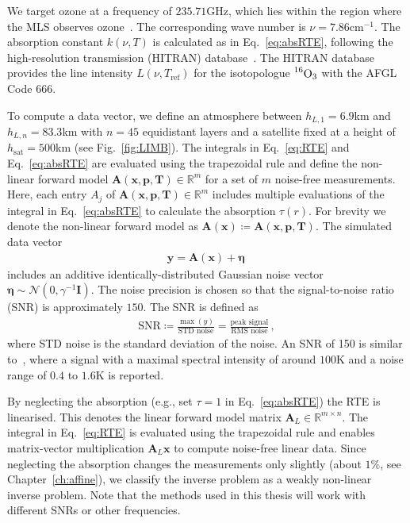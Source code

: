 We target ozone at a frequency of $235.71$GHz, which lies within the region where the MLS observes ozone~\cite{livesey2008ozonecarbonmono, waters2006earth}.
The corresponding wave number is $\nu = 7.86\text{cm}^{-1}$.
The absorption constant $k(\nu,T)$ is calculated as in Eq.~\ref{eq:absRTE}, following the high-resolution transmission (HITRAN) database~\cite{gordon2022hitran2020}.
The HITRAN database provides the line intensity $L(\nu,T_{\text{ref}})$ for the isotopologue $\prescript{16}{}{\text{O}}_3$ with the AFGL Code 666.

To compute a data vector, we define an atmosphere between $h_{L,1} = 6.9$km and $h_{L,n} = 83.3$km with $n = 45$ equidistant layers and a satellite fixed at a height of $h_{\text{sat}} = 500$km (see Fig.~\ref{fig:LIMB}).
The integrals in Eq.~\ref{eq:RTE} and Eq.~\ref{eq:absRTE} are evaluated using the trapezoidal rule and define the non-linear forward model $\bm{A}(\bm{x},  \bm{p},\bm{T})   \in \mathbb{R}^{m}$ for a set of $m$ noise-free measurements.
Here, each entry $A_{j}$ of $\bm{A}(\bm{x},\bm{p},\bm{T})\in \mathbb{R}^{m}$ includes multiple evaluations of the integral in Eq.~\ref{eq:absRTE} to calculate the absorption $\tau(r)$.
For brevity we denote the non-linear forward model as $\bm{A}(\bm{x}) \coloneqq \bm{A}(\bm{x},  \bm{p},\bm{T})$.
The simulated data vector
\begin{align}
	\bm{y} = \bm{A}(\bm{x}) + \bm{\eta}\, 
\end{align}
includes an additive identically-distributed Gaussian noise vector $\bm{\eta} \sim \mathcal{N}(0,\gamma^{-1} \bm{I})$.
The noise precision is chosen so that the signal-to-noise ratio (SNR) is approximately $150$.
The SNR is defined as
\begin{align}
	\text{SNR} \coloneqq \frac{\max(y)}{\text{STD noise}} = \frac{\text{peak signal}}{\text{RMS noise}} \label{eq:SNR} \, ,
\end{align}
where STD noise is the standard deviation of the noise.
An SNR of 150 is similar to~\cite{Froidevaux2008snrozone}, where a signal with a maximal spectral intensity of around $100\text{K}$ and a noise range of $0.4$ to $1.6\text{K}$ is reported.

By neglecting the absorption (e.g., set $\tau = 1$ in Eq.~\eqref{eq:absRTE}) the RTE is linearised.
This denotes the linear forward model matrix $\bm{A}_L\in \mathbb{R}^{m\times n}$.
The integral in Eq.~\eqref{eq:RTE} is evaluated using the trapezoidal rule and enables matrix-vector multiplication $\bm{A}_L \bm{x}$ to compute noise-free linear data.
Since neglecting the absorption changes the measurements only slightly (about $1\%$, see Chapter~\ref{ch:affine}), we classify the inverse problem as a weakly non-linear inverse problem.
Note that the methods used in this thesis will work with different SNRs or other frequencies.




